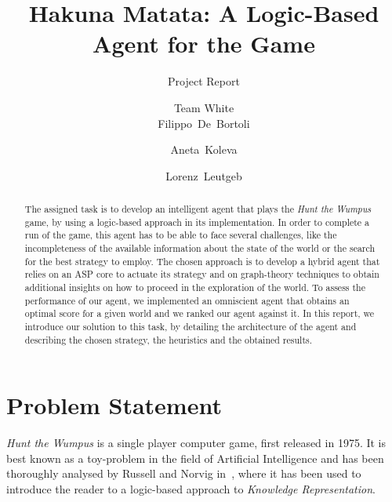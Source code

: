 \documentclass{llncs}
\title{Hakuna Matata: A Logic-Based Agent for the \htw Game}
\subtitle{Project Report}
\author{Team White\\[2mm]Filippo~De~Bortoli \and Aneta~Koleva \and Lorenz~Leutgeb}
\institute{Free University of Bozen-Bolzano\\[3mm] \texttt{\{\href{mailto:filippo.debortoli@stud-inf.unibz.it}{filippo.debortoli},\href{mailto:aneta.koleva@stud-inf.unibz.it}{aneta.koleva},\href{mailto:lorenz.leutgeb@stud-inf.unibz.it}{lorenz.leutgeb}\}\newline @stud-inf.unibz.it}}
\newcommand{\htw}{\emph{Hunt the Wumpus }}
\begin{document}
\maketitle
\thispagestyle{plain}

\begin{abstract}
  The assigned task is to develop an intelligent agent that plays the \htw game, by using a logic-based approach in its implementation.
  In order to complete a run of the game, this agent has to be able to face several challenges, like the incompleteness of the available information about the state of the world or the search for the best strategy to employ.
  The chosen approach is to develop a hybrid agent that relies on an ASP core to actuate its strategy and on graph-theory techniques to obtain additional insights on how to proceed in the exploration of the world.
  To assess the performance of our agent, we implemented an omniscient agent that obtains an optimal score for a given world and we ranked our agent against it.
  In this report, we introduce our solution to this task, by detailing the architecture of the agent and describing the chosen strategy, the heuristics and the obtained results.
\end{abstract}

\section{Problem Statement}

\htw is a single player computer game, first released in 1975.
It is best known as a toy-problem in the field of Artificial Intelligence and has been thoroughly analysed by Russell and Norvig in~\cite{book:aima}, where it has been used to introduce the reader to a logic-based approach to \emph{Knowledge Representation}.
\end{document}

